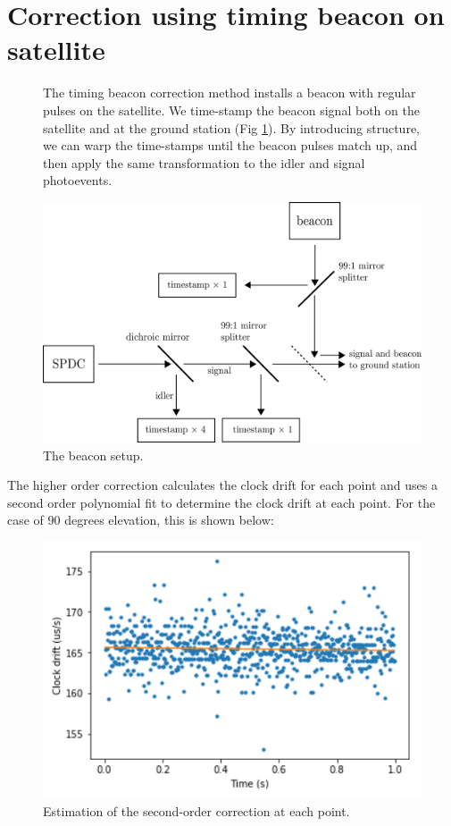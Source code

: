 \section{Correction using timing beacon on satellite}

\begin{figure}[ht!]
	\begin{minipage}{.4\textwidth}
		The timing beacon correction method installs a beacon with regular pulses on the satellite. We time-stamp the beacon signal both on the satellite and at the ground station (Fig \ref{fig:beacon}). By introducing structure, we can warp the time-stamps until the beacon pulses match up, and then apply the same transformation to the idler and signal photoevents.
		
	\end{minipage}
	\begin{minipage}{.6\textwidth}
		\centering
		\includegraphics[width=0.9\linewidth]{assets/beacon}
		\caption{The beacon setup.}
		\label{fig:beacon}
	\end{minipage}%

\end{figure}


The higher order correction calculates the clock drift for each point and uses a second order polynomial fit to determine the clock drift at each point. For the case of 90 degrees elevation, this is shown below:

\begin{figure}[ht!]
	\centering
	\includegraphics[width=0.7\linewidth]{assets/beacon_alex}
	\caption{Estimation of the second-order correction at each point.}
	\label{fig:beacon_alex}
\end{figure}

